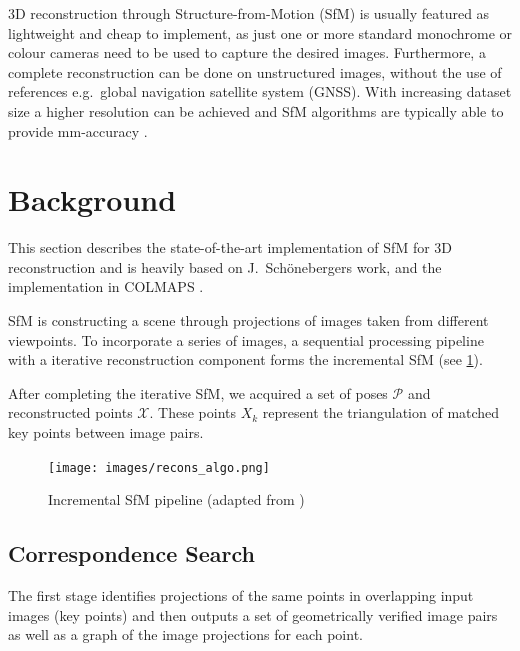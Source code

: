 \documentclass[conference,]{IEEEtran}
\begin{document}
3D reconstruction through Structure-from-Motion (SfM) is usually
featured as lightweight and cheap to implement, as just one or more
standard monochrome or colour cameras need to be used to capture the
desired images. Furthermore, a complete reconstruction can be done on
unstructured images, without the use of references e.g.~global
navigation satellite system (GNSS). With increasing dataset size a
higher resolution can be achieved and SfM algorithms are typically able
to provide mm-accuracy \autocite{paulus2019}.

\hypertarget{sec-background}{%
\section{Background}\label{sec-background}}

This section describes the state-of-the-art implementation of SfM for 3D
reconstruction and is heavily based on J.~Schönebergers
\autocite{schönberger2016,schönberger2016a} work, and the implementation
in COLMAPS \autocite{schönberger2024}.

SfM is constructing a scene through projections of images taken from
different viewpoints. To incorporate a series of images, a sequential
processing pipeline with a iterative reconstruction component forms the
incremental SfM (see \cref{fig-recons_algo}). \autocite{schönberger2016}

After completing the iterative SfM, we acquired a set of poses
\(\mathcal{P}\) and reconstructed points \(\mathcal{X}\). These points
\(X_k\) represent the triangulation of matched key points between image
pairs.

\begin{figure}[htbp]
\centering
\texttt{[image: images/recons\_algo.png]}
\caption{Incremental SfM pipeline (adapted from \autocite{schönberger2016})}
\label{fig-recons_algo}
\end{figure}

\hypertarget{correspondence-search}{%
\subsection{Correspondence Search}\label{correspondence-search}}

The first stage identifies projections of the same points in overlapping
input images (key points) and then outputs a set of geometrically
verified image pairs as well as a graph of the image projections for
each point. \autocite{schönberger2016}
\end{document}
